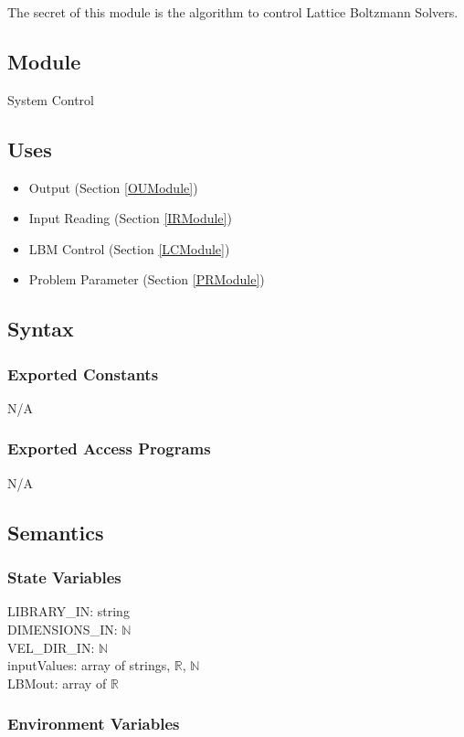 \documentclass[12pt, titlepage]{article}
\newcommand{\famname}{Lattice Boltzmann Solvers}
\begin{document}
The secret of this module is the algorithm to control \famname.

\subsection{Module}

System Control

\subsection{Uses}

\begin{itemize}
	\item Output (Section \ref{OUModule})
	\item Input Reading (Section \ref{IRModule})
	\item LBM Control (Section \ref{LCModule})
	\item Problem Parameter (Section \ref{PRModule})
\end{itemize}

\subsection{Syntax}

\subsubsection{Exported Constants}
N/A

\subsubsection{Exported Access Programs}
N/A

\subsection{Semantics}

\subsubsection{State Variables}
LIBRARY\_IN: string\\
DIMENSIONS\_IN: $\mathbb{N}$\\
VEL\_DIR\_IN: $\mathbb{N}$\\
inputValues: array of strings, $\mathbb{R}$, $\mathbb{N}$\\
LBMout: array of $\mathbb{R}$

\subsubsection{Environment Variables}
\end{document}
